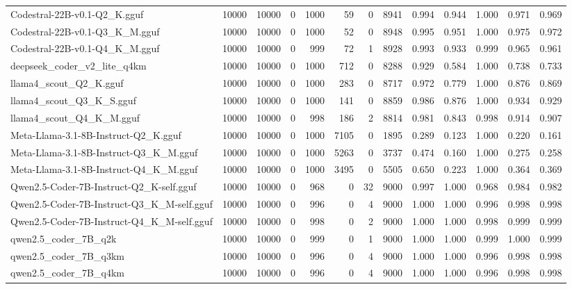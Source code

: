 \begin{table}[htbp]
{\begin{tabular}{lrrrrrrrrrrrr}
    Codestral-22B-v0.1-Q2\_K.gguf & 10000 & 10000 & 0 & 1000 & 59 & 0 & 8941 & 0.994 & 0.944 & 1.000 & 0.971 & 0.969 \\
    Codestral-22B-v0.1-Q3\_K\_M.gguf & 10000 & 10000 & 0 & 1000 & 52 & 0 & 8948 & 0.995 & 0.951 & 1.000 & 0.975 & 0.972 \\
    Codestral-22B-v0.1-Q4\_K\_M.gguf & 10000 & 10000 & 0 & 999 & 72 & 1 & 8928 & 0.993 & 0.933 & 0.999 & 0.965 & 0.961 \\
    deepseek\_coder\_v2\_lite\_q4km & 10000 & 10000 & 0 & 1000 & 712 & 0 & 8288 & 0.929 & 0.584 & 1.000 & 0.738 & 0.733 \\
    llama4\_scout\_Q2\_K.gguf & 10000 & 10000 & 0 & 1000 & 283 & 0 & 8717 & 0.972 & 0.779 & 1.000 & 0.876 & 0.869 \\
    llama4\_scout\_Q3\_K\_S.gguf & 10000 & 10000 & 0 & 1000 & 141 & 0 & 8859 & 0.986 & 0.876 & 1.000 & 0.934 & 0.929 \\
    llama4\_scout\_Q4\_K\_M.gguf & 10000 & 10000 & 0 & 998 & 186 & 2 & 8814 & 0.981 & 0.843 & 0.998 & 0.914 & 0.907 \\
    Meta-Llama-3.1-8B-Instruct-Q2\_K.gguf & 10000 & 10000 & 0 & 1000 & 7105 & 0 & 1895 & 0.289 & 0.123 & 1.000 & 0.220 & 0.161 \\
    Meta-Llama-3.1-8B-Instruct-Q3\_K\_M.gguf & 10000 & 10000 & 0 & 1000 & 5263 & 0 & 3737 & 0.474 & 0.160 & 1.000 & 0.275 & 0.258 \\
    Meta-Llama-3.1-8B-Instruct-Q4\_K\_M.gguf & 10000 & 10000 & 0 & 1000 & 3495 & 0 & 5505 & 0.650 & 0.223 & 1.000 & 0.364 & 0.369 \\
    Qwen2.5-Coder-7B-Instruct-Q2\_K-self.gguf & 10000 & 10000 & 0 & 968 & 0 & 32 & 9000 & 0.997 & 1.000 & 0.968 & 0.984 & 0.982 \\
    Qwen2.5-Coder-7B-Instruct-Q3\_K\_M-self.gguf & 10000 & 10000 & 0 & 996 & 0 & 4 & 9000 & 1.000 & 1.000 & 0.996 & 0.998 & \cellcolor{green!20}0.998 \\
    Qwen2.5-Coder-7B-Instruct-Q4\_K\_M-self.gguf & 10000 & 10000 & 0 & 998 & 0 & 2 & 9000 & 1.000 & 1.000 & 0.998 & 0.999 & \cellcolor{green!40}0.999 \\
    qwen2.5\_coder\_7B\_q2k & 10000 & 10000 & 0 & 999 & 0 & 1 & 9000 & 1.000 & 1.000 & 0.999 & 1.000 & \cellcolor{green!50}0.999 \\
    qwen2.5\_coder\_7B\_q3km & 10000 & 10000 & 0 & 996 & 0 & 4 & 9000 & 1.000 & 1.000 & 0.996 & 0.998 & \cellcolor{green!10}0.998 \\
    qwen2.5\_coder\_7B\_q4km & 10000 & 10000 & 0 & 996 & 0 & 4 & 9000 & 1.000 & 1.000 & 0.996 & 0.998 & 0.998 \\

\end{tabular}}
\end{table}
